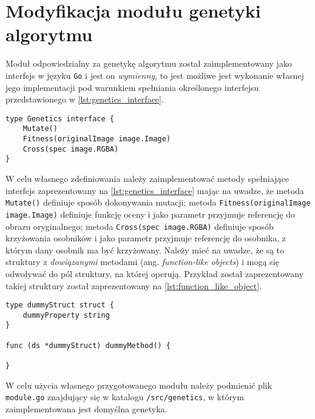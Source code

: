 \section{Modyfikacja modułu genetyki algorytmu}
\label{sec:genetics_interface_modifications}

Moduł odpowiedzialny za genetykę algorytmu został zaimplementowany jako interfejs w języku \texttt{Go} i jest on \textit{wymienny}, to jest możliwe jest wykonanie własnej jego implementacji pod warunkiem spełniania określonego interfejsu przedstawionego w \ref{lst:genetics_interface}.
\begin{lstlisting}[caption={Interfejs modułu genetyki}, captionpos=b, label={lst:genetics_interface}]
type Genetics interface {
	Mutate()
	Fitness(originalImage image.Image)
	Cross(spec image.RGBA)
}
\end{lstlisting}
W celu własnego zdefiniowania należy zaimplementować metody spełniające interfejs zaprezentowany na \ref{lst:genetics_interface} mając na uwadze, że metoda \texttt{Mutate()} definiuje sposób dokonywania mutacji; metoda \texttt{Fitness(originalImage image.Image)} definiuje funkcję oceny i jako parametr przyjmuje referencję do obrazu oryginalnego; metoda
\texttt{Cross(spec image.RGBA)} definiuje sposób krzyżowania osobników i jako parametr przyjmuje referencję do osobnika, z którym dany osobnik ma być krzyżowany. Należy mieć na uwadze, że są to struktury z \textit{dowiązanymi} metodami (ang. \textit{function-like objects}) i mogą się odwoływać do pól struktury, na której operują. Przykład został zaprezentowany takiej struktury został zaprezentowany na \ref{lst:function_like_object}.

\begin{lstlisting}[caption={Przykład \textit{function-like object}}, captionpos=b, label={lst:function_like_object}]
type dummyStruct struct {
    dummyProperty string
} 

func (ds *dummyStruct) dummyMethod() {

}
\end{lstlisting}

W celu użycia własnego przygotowanego modułu należy podmienić plik \texttt{module.go} znajdujący się w katalogu \texttt{/src/genetics}, w którym zaimplementowana jest domyślna genetyka.